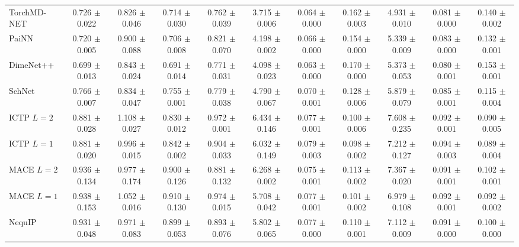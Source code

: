 \begin{table}[h]
{\begin{tabular}{lcccccccccc}
TorchMD-NET & 0.726 $\pm$ 0.022 & 0.826 $\pm$ 0.046 & 0.714 $\pm$ 0.030 & 0.762 $\pm$ 0.039 & 3.715 $\pm$ 0.006 & 0.064 $\pm$ 0.000 & 0.162 $\pm$ 0.003 & 4.931 $\pm$ 0.010 & 0.081 $\pm$ 0.000 & 0.140 $\pm$ 0.002 \\
PaiNN & 0.720 $\pm$ 0.005 & 0.900 $\pm$ 0.088 & 0.706 $\pm$ 0.008 & 0.821 $\pm$ 0.070 & 4.198 $\pm$ 0.002 & 0.066 $\pm$ 0.000 & 0.154 $\pm$ 0.000 & 5.339 $\pm$ 0.009 & 0.083 $\pm$ 0.000 & 0.132 $\pm$ 0.001 \\
DimeNet++ & 0.699 $\pm$ 0.013 & 0.843 $\pm$ 0.024 & 0.691 $\pm$ 0.014 & 0.771 $\pm$ 0.031 & 4.098 $\pm$ 0.023 & 0.063 $\pm$ 0.000 & 0.170 $\pm$ 0.000 & 5.373 $\pm$ 0.053 & 0.080 $\pm$ 0.001 & 0.153 $\pm$ 0.001 \\
SchNet & 0.766 $\pm$ 0.007 & 0.834 $\pm$ 0.047 & 0.755 $\pm$ 0.001 & 0.779 $\pm$ 0.038 & 4.790 $\pm$ 0.067 & 0.070 $\pm$ 0.001 & 0.128 $\pm$ 0.006 & 5.879 $\pm$ 0.079 & 0.085 $\pm$ 0.001 & 0.115 $\pm$ 0.004 \\
ICTP $L{=}2$ & 0.881 $\pm$ 0.028 & 1.108 $\pm$ 0.027 & 0.830 $\pm$ 0.012 & 0.972 $\pm$ 0.001 & 6.434 $\pm$ 0.146 & 0.077 $\pm$ 0.001 & 0.100 $\pm$ 0.006 & 7.608 $\pm$ 0.235 & 0.092 $\pm$ 0.001 & 0.090 $\pm$ 0.005 \\
ICTP $L{=}1$ & 0.881 $\pm$ 0.020 & 0.996 $\pm$ 0.015 & 0.842 $\pm$ 0.002 & 0.904 $\pm$ 0.033 & 6.032 $\pm$ 0.149 & 0.079 $\pm$ 0.003 & 0.098 $\pm$ 0.002 & 7.212 $\pm$ 0.127 & 0.094 $\pm$ 0.003 & 0.089 $\pm$ 0.004 \\
MACE $L{=}2$ & 0.936 $\pm$ 0.134 & 0.977 $\pm$ 0.174 & 0.900 $\pm$ 0.126 & 0.881 $\pm$ 0.132 & 6.268 $\pm$ 0.002 & 0.075 $\pm$ 0.001 & 0.113 $\pm$ 0.002 & 7.367 $\pm$ 0.020 & 0.091 $\pm$ 0.001 & 0.102 $\pm$ 0.001 \\
MACE $L{=}1$ & 0.938 $\pm$ 0.153 & 1.052 $\pm$ 0.016 & 0.910 $\pm$ 0.130 & 0.974 $\pm$ 0.015 & 5.708 $\pm$ 0.042 & 0.077 $\pm$ 0.001 & 0.101 $\pm$ 0.002 & 6.979 $\pm$ 0.108 & 0.092 $\pm$ 0.001 & 0.092 $\pm$ 0.002 \\
NequIP & 0.931 $\pm$ 0.048 & 0.971 $\pm$ 0.083 & 0.899 $\pm$ 0.053 & 0.893 $\pm$ 0.076 & 5.802 $\pm$ 0.065 & 0.077 $\pm$ 0.000 & 0.110 $\pm$ 0.001 & 7.112 $\pm$ 0.009 & 0.091 $\pm$ 0.000 & 0.100 $\pm$ 0.000 \\
\bottomrule
\end{tabular}%
}


\end{table}

